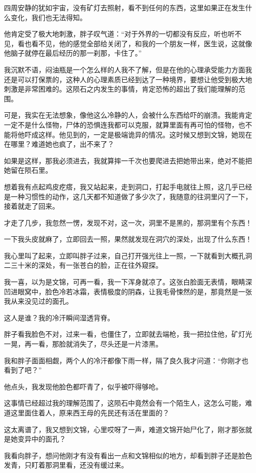 四周安静的犹如宇宙，没有矿灯去照射，看不到任何的东西，这里如果正在发生什么变化，我们也无法得知。

他肯定受了极大地刺激，胖子叹气道：“对于外界的一切都没有反应，听也听不见，看也看不见，他的感觉全部给关闭了，和我的一个朋友一样，医生说，这就像他脑子就停在最后经历的那一刹那，卡住了。”

我沉默不语，闷油瓶是一个怎么样的人我不了解，但是在他的心理承受能力方面我还是可以打保票的，这种人的心理素质已经到达了一种境界，要想让他受到极大地刺激是非常困难的。这陨石之内发生的事情，肯定恐怖的超出了我们能理解的范围。

可是，我实在无法想象，像他这么冷静的人，会被什么东西给吓的崩溃。我能肯定一定不是什么怪物，尸体的恐惧连我都可以克服，就算里面有再可怕的怪物，也不能将他吓成这样。他见到的，一定是极端诡异的情况。这时候又想到文锦，她现在在哪里？难道她也疯了，出不来了？

如果是这样，那我必须进去，我就算摔一千次也要爬进去把她带出来，绝对不能把她留在陨石里。

想着我有点起鸡皮疙瘩，我又站起来，走到洞口，打起手电就往上照，这几乎已经是一种习惯性的动作，这几天都不知道做了多少次了，我随意的往洞里闪了一下，接着就走了回来。

才走了几步，我忽然一愣，发现不对，这一次，洞里不是黑的，那洞里有个东西！

一下我头皮就麻了，立即回去一照，果然就发现在洞穴的深处，出现了什么东西！

我心里叫了起来，立即叫胖子过来，自己打开强光往上一照，一下就看到大概孔洞二三十米的深处，有一张苍白的脸，正在往外窥探。

我一喜，以为是文锦，可再一看，我一下浑身就凉了。这张白脸面无表情，眼睛深凹进眼窝中，脸色冷若冰霜，表情极度的阴森，让我毛骨悚然的是，那竟然是一张我从来没见过的面孔。

这人是谁？我的冷汗瞬间湿透背脊。

胖子看我脸色不对，过来一看，也僵住了，立即就去端枪，我一把拉住他，矿灯光一晃，再一看，那脸就消失了，尽头还是一片漆黑。

我和胖子面面相觑，两个人的冷汗都像下雨一样，隔了良久我才问道：“你刚才也看到了吧？”

他点头，我发现他脸色都吓青了，似乎被吓得够呛。

这事情已经超过我的理解范围了，这陨石中竟然会有一个陌生人，这怎么可能，难道这里面住着人，原来西王母的先民还有活在里面的？

这太离谱了，我又想到文锦，心里哎呀了一声，难道文锦开始尸化了，刚才那张就是她变异中的面孔？

我看向胖子，想问他刚才有没有看出一点和文锦相似的地方，却看到胖子还是脸色发青，只盯着那洞里看，还没有缓过来。

